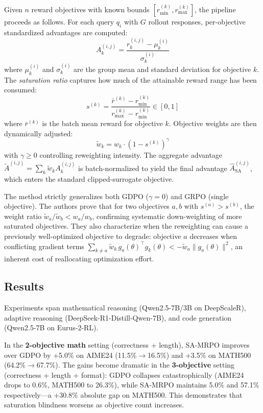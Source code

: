 \documentclass[11pt,a4paper]{article}
\begin{document}
Given $n$ reward objectives with known bounds $[r_{\min}^{(k)}, r_{\max}^{(k)}]$, the pipeline proceeds as follows. For each query $q_i$ with $G$ rollout responses, per-objective standardized advantages are computed:
\begin{equation}
A_k^{(i,j)} = \frac{r_k^{(i,j)} - \mu_k^{(i)}}{\sigma_k^{(i)}}
\end{equation}
where $\mu_k^{(i)}$ and $\sigma_k^{(i)}$ are the group mean and standard deviation for objective $k$. The \emph{saturation ratio} captures how much of the attainable reward range has been consumed:
\begin{equation}
s^{(k)} = \frac{\bar{r}^{(k)} - r_{\min}^{(k)}}{r_{\max}^{(k)} - r_{\min}^{(k)}} \in [0, 1]
\end{equation}
where $\bar{r}^{(k)}$ is the batch mean reward for objective $k$. Objective weights are then dynamically adjusted:
\begin{equation}
\tilde{w}_k = w_k \cdot (1 - s^{(k)})^{\gamma}
\end{equation}
with $\gamma \geq 0$ controlling reweighting intensity. The aggregate advantage $\tilde{A}^{(i,j)} = \sum_k \tilde{w}_k A_k^{(i,j)}$ is batch-normalized to yield the final advantage $\hat{A}_{\mathrm{SA}}^{(i,j)}$, which enters the standard clipped-surrogate objective.

The method strictly generalizes both GDPO ($\gamma = 0$) and GRPO (single objective). The authors prove that for two objectives $a, b$ with $s^{(a)} > s^{(b)}$, the weight ratio $\tilde{w}_a / \tilde{w}_b < w_a / w_b$, confirming systematic down-weighting of more saturated objectives. They also characterize when the reweighting can cause a previously well-optimized objective to degrade: objective $a$ decreases when conflicting gradient terms $\sum_{k \neq a} \tilde{w}_k \, g_a(\theta)^\top g_k(\theta) < -\tilde{w}_a \|g_a(\theta)\|^2$, an inherent cost of reallocating optimization effort.

\subsection{Results}
Experiments span mathematical reasoning (Qwen2.5-7B/3B on DeepScaleR), adaptive reasoning (DeepSeek-R1-Distill-Qwen-7B), and code generation (Qwen2.5-7B on Eurus-2-RL).

In the \textbf{2-objective math} setting (correctness + length), SA-MRPO improves over GDPO by +5.0\% on AIME24 (11.5\%$\to$16.5\%) and +3.5\% on MATH500 (64.2\%$\to$67.7\%). The gains become dramatic in the \textbf{3-objective} setting (correctness + length + format): GDPO collapses catastrophically (AIME24 drops to 0.6\%, MATH500 to 26.3\%), while SA-MRPO maintains 5.0\% and 57.1\% respectively---a +30.8\% absolute gap on MATH500. This demonstrates that saturation blindness worsens as objective count increases.
\end{document}
